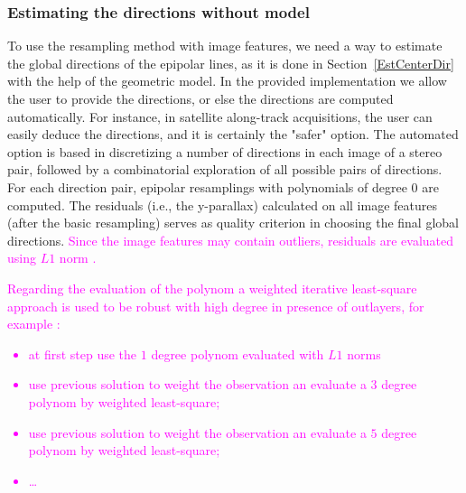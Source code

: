 \documentclass{ipol}
\newcommand{\mpd}[1]{\textcolor{magenta}{#1}}
\begin{document}
\subsubsection{Estimating the directions without model}
%
To use the resampling method with image features, we need a way to estimate the global directions of the epipolar lines, as it is done in Section~\ref{EstCenterDir} with the help of the geometric model. In the provided implementation we allow the user to provide the directions, or else the directions are computed automatically. For instance, in satellite along-track acquisitions, the user can easily deduce the directions, and it is certainly the "safer" option. The automated option is based in discretizing a number of directions in each image of a stereo pair, followed by a combinatorial exploration of all possible pairs of directions. For each direction pair, epipolar resamplings with polynomials of degree $0$ are computed. The residuals (i.e., the y-parallax) calculated on all image features (after the basic resampling) serves as quality criterion in choosing the final global directions. \mpd{ Since the image features may contain outliers, residuals are evaluated using $L1$ norm .}


\mpd{Regarding the evaluation of the polynom a weighted iterative least-square approach is used to be robust with high degree in presence of outlayers, for example :}

\mpd{
\begin{itemize}
   \item at first step use the $1$ degree polynom evaluated with $L1$ norms
   \item use previous solution to weight the observation an evaluate a $3$ degree polynom by weighted least-square;
   \item use previous solution to weight the observation an evaluate a $5$ degree polynom by weighted least-square;
   \item  \dots  
\end{itemize}}




\end{document}
